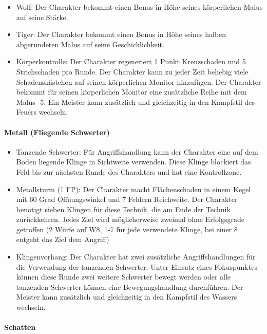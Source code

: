 \documentclass{article}
\begin{document}
\begin{itemize}
\item Wolf: Der Charakter bekommt einen Bonus in Höhe seines körperlichen Malus auf seine Stärke.
\item Tiger: Der Charakter bekommt einen Bonus in Höhe seines halben abgerundeten Malus auf seine Geschicklichkeit.
\item Körperkontrolle: Der Charakter regeneriert 1 Punkt Kreuzschaden und 5 Strichschaden pro Runde. Der Charakter kann zu jeder Zeit beliebig viele Schadenskästchen auf seinen körperlichen Monitor hinzufügen. Der Charakter bekommt für seinen körperlichen Monitor eine zusätzliche Reihe mit dem Malus -5. Ein Meister kann zusätzlich und gleichzeitig in den Kampfstil des Feuers wechseln.
\end{itemize}

\paragraph{Metall (Fliegende Schwerter)}

\begin{itemize}
\item Tanzende Schwerter: Für Angriffshandlung kann der Charakter eine auf dem Boden liegende Klinge in Sichtweite verwenden. Diese Klinge blockiert das Feld bis zur nächsten Runde des Charakters und hat eine Kontrollzone.
\item Metallsturm (1 FP): Der Charakter macht Flächenschaden in einem Kegel mit 60 Grad Öffnungswinkel und 7 Feldern Reichweite. Der Charakter benötigt sieben Klingen für diese Technik, die am Ende der Technik zurückkehren. Jedes Ziel wird möglicherweise zweimal ohne Erfolgsgrade getroffen (2 Würfe auf W8, 1-7 für jede verwendete Klinge, bei einer 8 entgeht das Ziel dem Angriff)
\item Klingenvorhang: Der Charakter hat zwei zusätzliche Angriffshandlungen für die Verwendung der tanzenden Schwerter. Unter Einsatz eines Fokuspunktes können diese Runde zwei weitere Schwerter bewegt werden oder alle tanzenden Schwerter können eine Bewegungshandlung durchführen. Der Meister kann zusätzlich und gleichzeitig in den Kampfstil des Wassers wechseln.
\end{itemize}

\paragraph{Schatten}
\end{document}
